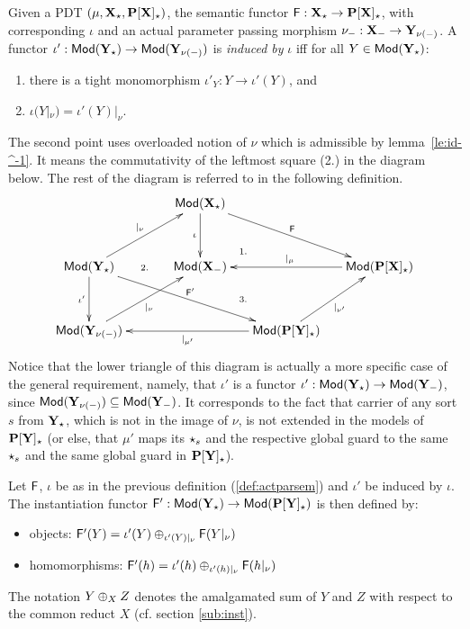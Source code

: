 \begin{definition}\label{def:actparsem}
Given a PDT $(\mu,{\bf X_\star}, {\bf P[X]_\star})$,
the semantic functor ${\sf {F}}:{\bf X_\star} \to {\bf P[X]_\star}$, with
corresponding $\iota$ and an actual parameter passing morphism $\nu_-:
{\bf X_-} \to {\bf Y_{\nu(-)}}$. A 
functor $\iota': {\sf {Mod}}({\bf Y_\star}) \to
{\sf {Mod}}({\bf Y_{\nu(-)}})$ is {\em induced by} $\iota$ iff for all $Y \in
{\sf {Mod}}({\bf Y_\star})$:
\begin{enumerate}\MyLPar
\item there is a tight monomorphism $\iota'_Y:Y\to \iota'(Y)$, and
\item $\iota( Y |_{\nu}) = \iota'(Y)|_{\nu}$.
\end{enumerate}
\end{definition}
The second point uses overloaded notion of $\nu$ which is admissible by
lemma~\ref{le:id-^-1}. It means the commutativity of the leftmost
square (2.)
in the diagram below. The rest of the diagram is referred to 
in the following definition.
\[ \xymatrix@R=0.5cm@C=0.5cm{
&& \Mod(\thr{X_\cons})  \ar[dd]_{\iota} \ar[rrdd]^{\fu{F}}\\
&& && \\
\Mod(\thr{Y_\cons}) \ar[dd]_{\iota'} \ar[rrrdd]^{\fu{F'}} \ar[rruu]^{|_{\nu}}
	&& \Mod(\thr{X_{\weak}}) \ar@{}[ur]|{1.}
		&& \Mod(\thr{P[X]_\cons}) \ar[ll]_{|_{\mu}} \\
&& && \\
\Mod(\thr{Y_{\nu(\weak)}}) \ar[uurr]_{|_{\nu}}  \ar@{}[uuuurr]|{2.}
	&&& \Mod(\thr{P[Y]_\cons}) \ar[lll]^{|_{\mu'}} \ar[uur]_{|_{\nu'}} \ar@{}[luu]|{3.}	
								}
\]
%
Notice that the lower triangle of this diagram is actually a more specific
case of the general requirement, namely, that $\iota'$ is a functor
$\iota':{\sf {Mod}}({\bf Y_\star})\to{\sf {Mod}}({\bf Y_-})$, since
${\sf {Mod}}({\bf Y_{\nu(-)}})\subseteq{\sf {Mod}}({\bf Y_-})$. It corresponds to
the fact that carrier of any sort $s$ from ${\bf Y_\star}$, which is not in the image of $\nu$, is not
extended in the models of ${\bf P[Y]_\star}$ (or else, that $\mu'$ maps its
$\star_s$ and the respective global guard to the same $\star_s$ and the same
global guard in ${\bf P[Y]_\star}$).
%
\begin{definition}\label{def:actinstfunct} 
Let ${\sf {F}}$, $\iota$ be as in the previous definition (\ref{def:actparsem}) and
$\iota'$ be induced by $\iota$. 
The instantiation functor ${\sf {F'}}: {\sf {Mod}}({\bf Y_\star}) \to
{\sf {Mod}}({\bf P[Y]_\star})$ is then defined by: 
\begin{itemize} 
\item objects: ${\sf {F'}}(Y) = \iota'(Y)
	\oplus_{\iota'(Y)|_{\nu}} {\sf {F}}(Y|_\nu)$ 
\item homomorphisms:
	${\sf {F'}}(h) = \iota'(h) \oplus_{\iota'(h)|_{\nu}} {\sf {F}}(h|_\nu)$
\end{itemize}
\end{definition}
The notation $Y\oplus_X Z$ denotes the amalgamated sum of $Y$ and $Z$ with
respect to the common reduct $X$ (cf. section \ref{sub:inst}).

